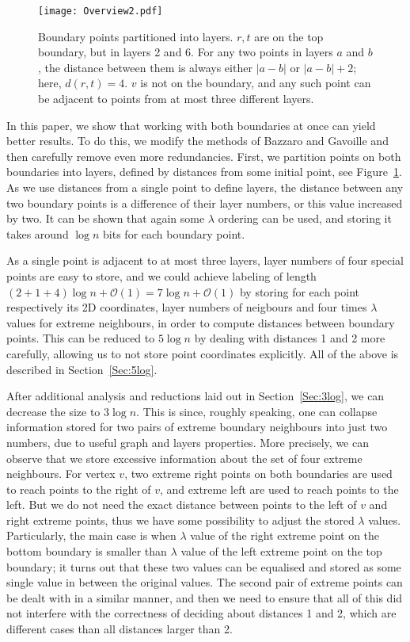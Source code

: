 \documentclass[a4paper,11pt]{article}
\newcommand{\Oh}{\mathcal{O}}
\newcommand{\lam}{\lambda}
\begin{document}
\begin{figure}[h]
\begin{center}
  \texttt{[image: Overview2.pdf]}
\end{center}
\caption{Boundary points partitioned into layers. $r,t$ are on the top boundary, but in layers 2 and 6.
For any two points in layers $a$ and $b$, the distance between them is always either $|a-b|$ or $|a-b|+2$;
here, $d(r,t)=4$.
$v$ is not on the boundary, and any such point can be adjacent to points from at most three different layers.}
\label{Fig:Over2}
\end{figure}

In this paper, we show that working with both boundaries at once can yield better results.
To do this, we modify the methods of Bazzaro and Gavoille and then carefully remove even more redundancies.
First, we partition points on both boundaries into layers, defined by distances from some initial point,
see Figure~\ref{Fig:Over2}.
As we use distances from a single point to define layers, the distance between any two boundary points is a difference
of their layer numbers, or this value increased by two.
It can be shown that again some $\lam$ ordering can be used, and storing it takes around $\log{n}$ bits for each boundary point.

As a single point is adjacent to at most three layers, layer numbers of four special points are easy to store,
and we could achieve labeling of length $(2+1+4)\log{n}+\Oh(1)=7\log{n}+\Oh(1)$ by storing for each point respectively
its 2D coordinates, layer numbers of neigbours and four times $\lam$ values for extreme neighbours,
in order to compute distances between boundary points.
This can be reduced to $5\log{n}$ by dealing with distances 1 and 2 more carefully, allowing us to not store point coordinates explicitly.
All of the above is described in Section~\ref{Sec:5log}.

After additional analysis and reductions laid out in Section~\ref{Sec:3log}, we can decrease the size to $3\log{n}$.
This is since, roughly speaking, one can collapse information stored for two pairs of extreme
boundary neighbours into just two numbers, due to useful graph and layers properties.
More precisely, we can observe that we store excessive information about the set of four extreme neighbours.
For vertex $v$, two extreme right points on both boundaries are used to reach points to the right of $v$,
and extreme left are used to reach points to the left.
But we do not need the exact distance between points to the left of $v$ and right extreme points, thus we have some possibility
to adjust the stored $\lam$ values.
Particularly, the main case is when $\lam$ value of the right extreme point on the bottom boundary is smaller than 
$\lam$ value of the left extreme point on the top boundary;
it turns out that these two values can be equalised and stored as some single value in between the original values.
The second pair of extreme points can be dealt with in a similar manner, and then we need to ensure that all of this
did not interfere with the correctness of deciding about distances 1 and 2, which are different cases than all distances
larger than 2.
\end{document}
